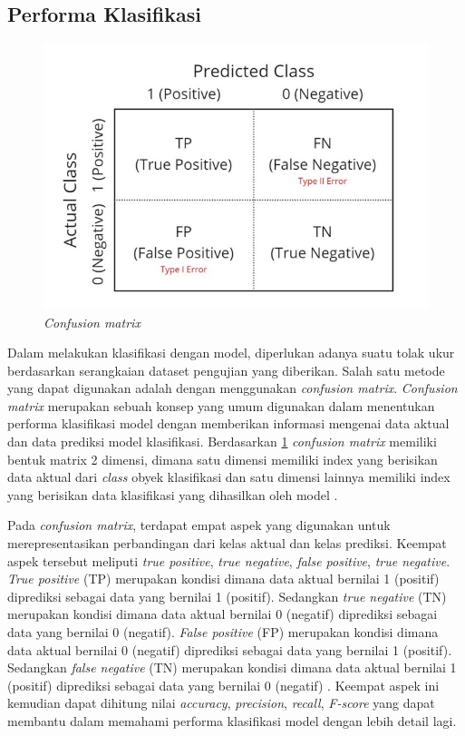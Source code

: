 \subsection{Performa Klasifikasi}

\begin{figure}[H]
    \centering

    \includegraphics[scale=0.8]{gambar/bab2-confusion-matrix.png}
 
    \caption{\textit{Confusion matrix}}
    \label{fig:confusionMatrix}
\end{figure}

Dalam melakukan klasifikasi dengan model, diperlukan adanya suatu tolak ukur berdasarkan serangkaian dataset pengujian yang diberikan. Salah satu metode yang dapat digunakan adalah dengan menggunakan \textit{confusion matrix}. \textit{Confusion matrix} merupakan sebuah konsep yang umum digunakan dalam menentukan performa klasifikasi model dengan memberikan informasi mengenai data aktual dan data prediksi model klasifikasi. Berdasarkan \ref{fig:confusionMatrix} \textit{confusion matrix} memiliki bentuk matrix 2 dimensi, dimana satu dimensi memiliki index yang berisikan data aktual dari \textit{class} obyek klasifikasi dan satu dimensi lainnya memiliki index yang berisikan data klasifikasi yang dihasilkan oleh model \parencite{deng2016}. 

Pada \textit{confusion matrix}, terdapat empat aspek yang digunakan untuk merepresentasikan perbandingan dari kelas aktual dan kelas prediksi. Keempat aspek tersebut meliputi \textit{true positive}, \textit{true negative}, \textit{false positive}, \textit{true negative}. \textit{True positive} (TP) merupakan kondisi dimana data aktual bernilai 1 (positif) diprediksi sebagai data yang bernilai 1 (positif). Sedangkan \textit{true negative} (TN) merupakan kondisi dimana data aktual bernilai 0 (negatif) diprediksi sebagai data yang bernilai 0 (negatif). \textit{False positive} (FP) merupakan kondisi dimana data aktual bernilai 0 (negatif) diprediksi sebagai data yang bernilai 1 (positif). Sedangkan \textit{false negative} (TN) merupakan kondisi dimana data aktual bernilai 1 (positif) diprediksi sebagai data yang bernilai 0 (negatif) \parencite{shajihan2020}. Keempat aspek ini kemudian dapat dihitung nilai \textit{accuracy}, \textit{precision}, \textit{recall}, \textit{F-score} yang dapat membantu dalam memahami performa klasifikasi model dengan lebih detail lagi.


